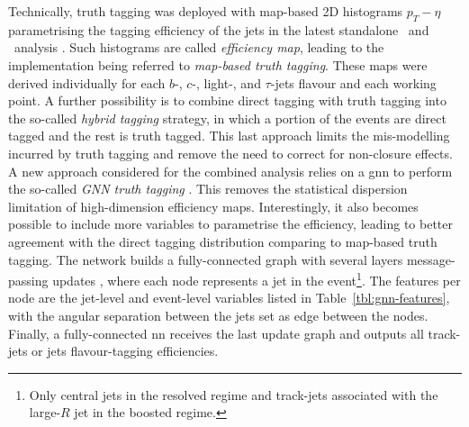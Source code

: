 Technically, truth tagging was deployed with map-based 2D histograms $p_T - \eta$ parametrising the tagging efficiency of the jets in the latest standalone \vhb\ and \vhc\ analysis \cite{ATLAS:2020fcp, Collaboration:2721696}. Such histograms are called \textit{efficiency map}, leading to the implementation being referred to \textit{map-based truth tagging}. These maps were derived individually for each $b$-, $c$-, light-, and $\tau$-jets flavour and each working point. A further possibility is to combine direct tagging with truth tagging into the so-called \textit{hybrid tagging} strategy, in which a portion of the events are direct tagged and the rest is truth tagged. This last approach limits the mis-modelling incurred by truth tagging and remove the need to correct for non-closure effects. \\

A new approach considered for the combined analysis relies on a \gls{gnn} to perform the so-called \textit{GNN truth tagging} \cite{ATL-PHYS-PUB-2022-041}. This removes the statistical dispersion limitation of high-dimension efficiency maps. Interestingly, it also becomes possible to include more variables to parametrise the efficiency, leading to better agreement with the direct tagging distribution comparing to map-based truth tagging. The network builds a fully-connected graph with several layers message-passing updates \cite{graphInductiveBias}, where each node represents a jet in the event\footnote{Only central jets in the resolved regime and track-jets associated with the large-$R$ jet in the boosted regime.}. The features per node are the jet-level and event-level variables listed in Table~\ref{tbl:gnn-features}, with the angular separation between the jets set as edge between the nodes. Finally, a fully-connected \gls{nn} receives the last update graph and outputs all track-jets or jets flavour-tagging efficiencies.

